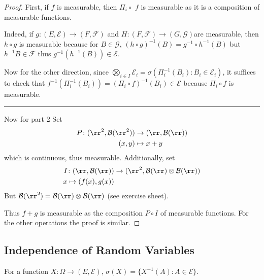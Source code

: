 \documentclass[../main.tex]{subfiles}
\begin{document}
\begin{proof}
    First, if $f$ is measurable, then $\Pi_i \circ$ $f$ is measurable as it is a composition of
    measurable functions.

    \vspace{0.2em}
    Indeed, if $g \colon(E, \mathcal{E}) \to (F, \mathcal{F})$ and $H \colon (F, \mathcal{F})
    \to (G, \mathcal{G})$are measurable, then $h \circ g$ is measurable because for $B \in
    \mathcal{G}$, $(h \circ g)^{-1}(B) = g^{-1}\circ h^{-1}(B)$ but $h^{-1}B \in \mathcal{F}$
    thus $g^{-1}(h^{-1}(B)) \in \mathcal{E}$.

    \vspace{0.5em}

    Now for the other direction, since $\bigotimes_{i \in I} \mathcal{E}_i = \sigma \left(
    \Pi_{i}^{-1} (B_i) \colon B_i \in \mathcal{E}_i \right) $, it suffices to check that 
    $f^{-1}(\Pi_i^{-1} (B_i)) = (\Pi_i \circ f)^{-1} (B_i) \in \mathcal{E}$ because $\Pi_i
    \circ f$ is measurable.

    \noindent
    \rule{\textwidth}{0.4pt}

    Now for part 2 Set
    \begin{align*}
      P \colon (\rr^{2}, \mathcal{B}(\rr^2)) &\to (\rr, \mathcal{B}(\rr)) \\
      (x, y) &\mapsto x + y
    \end{align*}
    which is continuous, thus measurable. Additionally, set 
    \begin{align*}
      I \colon (\rr, \mathcal{B}(\rr)) &\to (\rr^2, \mathcal{B}(\rr) \otimes \mathcal{B}(\rr))
      \\ 
      x \mapsto (f(x), g(x))
    \end{align*}
    But $\mathcal{B}(\rr^2) = \mathcal{B}(\rr) \otimes \mathcal{B}(\rr)$ (see exercise sheet).
    \vspace{0.3em}

    Thus $f + g$ is measurable as the composition $P \circ I$ of measurable functions. For the
    other operations the proof is similar.
\end{proof}

\subsection{Independence of Random Variables}

For a function $X \colon \Omega \to (E, \mathcal{E})$, $\sigma(X) = \{ X^{-1}(A) \colon A \in
\mathcal{E} \} $.
\end{document}

